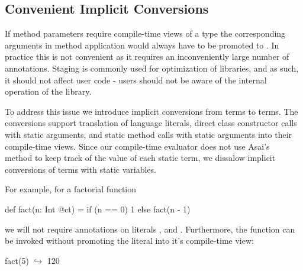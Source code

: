 \subsection{Convenient Implicit Conversions}
\label{sct:implicits}

If method parameters require compile-time views of a type the corresponding arguments
 in method application would always have to be promoted to .
 In practice this is not convenient as it requires an inconveniently large number
 of annotations. Staging is commonly used for optimization of libraries, and as such, it should not
 affect user code - users should not be aware of the internal operation of the library.

To address this issue we introduce implicit conversions from  terms to  terms.
 The conversions support translation of language literals, direct class constructor calls with static arguments, and static method
 calls with static arguments into their compile-time views. Since our compile-time evaluator does
 not use Asai's~\cite{asai2002binding,sumii2001hybrid} method to keep track of
 the value of each static term, we dissalow implicit conversions of terms with static variables.

For example, for a factorial function \begin{lstparagraph}
def fact(n: Int @ct) = if (n == 0) 1 else fact(n - 1)
 \end{lstparagraph} we will not require annotations on literals , and . Furthermore,
 the function can be invoked without promoting the literal  into it's compile-time view:\begin{lstparagraph}
fact(5)
  $\hookrightarrow$ 120
 \end{lstparagraph}
